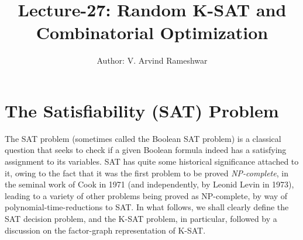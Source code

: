 \documentclass[letterpaper,english,11pt]{article}
\title{Lecture-27: Random K-SAT and Combinatorial Optimization}
\author{Author: V. Arvind Rameshwar}
\begin{document}
\maketitle
\section{The Satisfiability (SAT) Problem}

The SAT problem (sometimes called the Boolean SAT problem) is a classical question that seeks to check if a given Boolean formula indeed has a satisfying assignment to its variables. SAT has quite some historical significance attached to it, owing to the fact that it was the first problem to be proved \textit{NP-complete}, in the seminal work of Cook in 1971 (and independently, by Leonid Levin in 1973), leading to a variety of other problems being proved as NP-complete, by way of polynomial-time-reductions to SAT. In what follows, we shall clearly define the SAT decision problem, and the K-SAT problem, in particular, followed by a discussion on the factor-graph representation of K-SAT.\\
\end{document}
